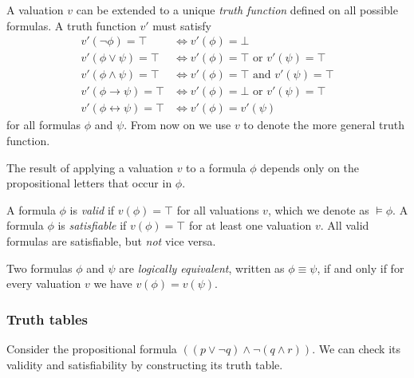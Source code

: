 A valuation \(v\) can be extended to a unique \emph{truth function} defined on all possible formulas. A truth function \(v'\) must satisfy
%
\begin{align*}
    v'(\neg \phi) = \top &\iff v'(\phi) = \bot\\
    v'(\phi \lor \psi) = \top &\iff v'(\phi) = \top \text{ or } v'(\psi) = \top\\
    v'(\phi \land \psi) = \top &\iff v'(\phi) = \top \text{ and } v'(\psi) = \top\\
    v'(\phi \rightarrow \psi) = \top &\iff v'(\phi) = \bot \text{ or } v'(\psi) = \top\\
    v'(\phi \leftrightarrow \psi) = \top &\iff v'(\phi) = v'(\psi)
\end{align*}
%
for all formulas \(\phi\) and \(\psi\). From now on we use \(v\) to denote the more general truth function.

The result of applying a valuation \(v\) to a formula \(\phi\) depends only on the propositional letters that occur in \(\phi\). 

A formula \(\phi\) is \emph{valid} if \(v(\phi) = \top\) for all valuations \(v\), which we denote as \(\models \phi\). A formula \(\phi\) is \emph{satisfiable} if \(v(\phi) = \top\) for at least one valuation \(v\). All valid formulas are satisfiable, but \emph{not} vice versa.

Two formulas \(\phi\) and \(\psi\) are \emph{logically equivalent}, written as \(\phi \equiv \psi\), if and only if for every valuation \(v\) we have \(v(\phi) = v(\psi)\).



\subsubsection{Truth tables}

Consider the propositional formula \(((p \lor \neg q) \land \neg (q \land r))\). We can check its validity and satisfiability by constructing its truth table.

